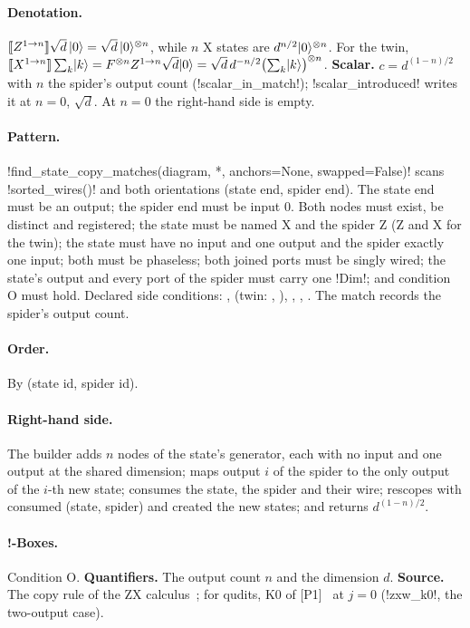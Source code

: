 \paragraph{Denotation.} $\llbracket Z^{1\to n} \rrbracket\sqrt d\,\lvert 0 \rangle=\sqrt d\,\lvert 0 \rangle^{\otimes n}$, while $n$ X states are $d^{n/2}\lvert 0 \rangle^{\otimes n}$. For the twin, $\llbracket X^{1\to n} \rrbracket\sum_k\lvert k \rangle=F^{\otimes n}Z^{1\to n}\sqrt d\lvert 0 \rangle=\sqrt d\,d^{-n/2}\bigl(\sum_k\lvert k \rangle\bigr)^{\otimes n}$. \textbf{Scalar.} $c=d^{(1-n)/2}$ with $n$ the spider's output count (\py!scalar_in_match!); \py!scalar_introduced! writes it at $n=0$, $\sqrt d$. At $n=0$ the right-hand side is empty.

\paragraph{Pattern.} \py!find_state_copy_matches(diagram, *, anchors=None, swapped=False)! scans \py!sorted_wires()! and both orientations (state end, spider end). The state end must be an output; the spider end must be input 0. Both nodes must exist, be distinct and registered; the state must be named X and the spider Z (Z and X for the twin); the state must have no input and one output and the spider exactly one input; both must be phaseless; both joined ports must be singly wired; the state's output and every port of the spider must carry one \py!Dim!; and condition O must hold. Declared side conditions: ,  (twin: , ), , , . The match records the spider's output count.

\paragraph{Order.} By (state id, spider id).

\paragraph{Right-hand side.} The builder adds $n$ nodes of the state's generator, each with no input and one output at the shared dimension; maps output $i$ of the spider to the only output of the $i$-th new state; consumes the state, the spider and their wire; rescopes with consumed (state, spider) and created the new states; and returns $d^{(1-n)/2}$.

\paragraph{!-Boxes.} Condition O. \textbf{Quantifiers.} The output count $n$ and the dimension $d$. \textbf{Source.} The copy rule of the ZX calculus~\cite{coecke2011interacting}; for qudits, K0 of [P1]~\cite{poor2023zxw} at $j=0$ (\py!zxw_k0!, the two-output case).

